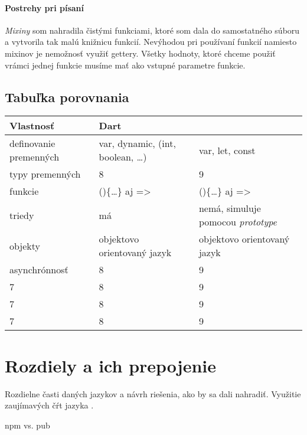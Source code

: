 \paragraph{Postrehy pri písaní}
\emph{Mixiny} som nahradila čistými funkciami, ktoré som dala do samostatného súboru a vytvorila tak malú knižnicu funkcií.
Nevýhodou pri používaní funkcií namiesto mixinov je nemožnosť využiť gettery. Všetky hodnoty, ktoré chceme použiť vrámci jednej funkcie musíme mať ako vstupné parametre funkcie.

\subsection{Tabuľka porovnania}

\begin{tabular}{| l | l | l |}
 \hline         %
   Vlastnosť & Dart & \JS{} \\ %
  \hline
  \hline
   definovanie premenných & 
   var, dynamic,  (int, boolean, \ldots)& %
   var, let, const \\
   \hline
   typy premenných & %
   8 & 
   9 \\
   \hline
   funkcie & 
   ()\{\ldots\} aj => & 
   ()\{\ldots\} aj => \\
   \hline
   triedy & 
   má & 
   nemá, simuluje pomocou \emph{prototype} \\
   \hline
   objekty & 
   objektovo orientovaný jazyk & 
   objektovo orientovaný jazyk \\
   \hline
   asynchrónnosť & %
   8 & 
   9 \\
   \hline
   7 & 
   8 & 
   9 \\
   \hline
   7 & 
   8 & 
   9 \\
   \hline
   7 & 
   8 & 
   9 \\
  \hline        %
 \end{tabular}

\section{Rozdiely a ich prepojenie}
Rozdielne časti daných jazykov a návrh riešenia, ako by sa dali nahradiť. Využitie zaujímavých čŕt jazyka \JS{}.

npm vs. pub